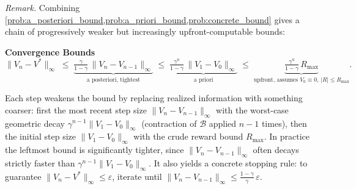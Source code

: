\documentclass[11pt]{article}
\begin{document}

\emph{Remark.} Combining \cref{prob:a_posteriori_bound,prob:a_priori_bound,prob:concrete_bound} gives a chain of progressively weaker but increasingly upfront-computable bounds:

\begin{callout}[note]
\textbf{Convergence Bounds}
$$
\|V_n - V^*\|_\infty
\;\le\; \underbrace{\tfrac{\gamma}{1-\gamma}\, \|V_n - V_{n-1}\|_\infty}_{\text{a~posteriori, tightest}}
\;\le\; \underbrace{\tfrac{\gamma^n}{1-\gamma}\, \|V_1 - V_0\|_\infty}_{\text{a~priori}}
\;\le\; \underbrace{\tfrac{\gamma^n}{1-\gamma}\, R_{\max}}_{\text{upfront, assumes } V_0 \equiv 0,\, |R| \le R_{\max}}.
$$
\end{callout}
Each step weakens the bound by replacing realized information with something coarser: first the most recent step size $\|V_n - V_{n-1}\|_\infty$ with the worst-case geometric decay $\gamma^{n-1}\|V_1 - V_0\|_\infty$ (contraction of $\mathcal{B}$ applied $n-1$ times), then the initial step size $\|V_1 - V_0\|_\infty$ with the crude reward bound $R_{\max}$. In practice the leftmost bound is significantly tighter, since $\|V_n - V_{n-1}\|_\infty$ often decays strictly faster than $\gamma^{n-1}\|V_1 - V_0\|_\infty$. It also yields a concrete stopping rule: to guarantee $\|V_n - V^*\|_\infty \le \varepsilon$, iterate until $\|V_n - V_{n-1}\|_\infty \le \frac{1-\gamma}{\gamma}\, \varepsilon$.

\end{document}
